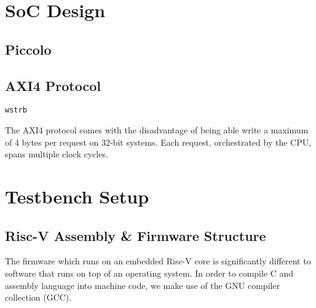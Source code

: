 \documentclass[a4paper,9pt]{report}
\begin{document}





%




\section{SoC Design}
\subsection{Piccolo}

\subsection{AXI4 Protocol}
\texttt{wstrb}

The AXI4 protocol comes with the disadvantage of being able write a maximum of 4
bytes per request on 32-bit systems. Each request, orchestrated by the CPU,
spans multiple clock cycles.





\section{Testbench Setup}
\subsection{Risc-V Assembly \& Firmware Structure}
The firmware which runs on an embedded Risc-V core is significantly different to
software that runs on top of an operating system. In order to compile C and
assembly language into machine code, we make use of the GNU compiler collection
(GCC).
\end{document}
